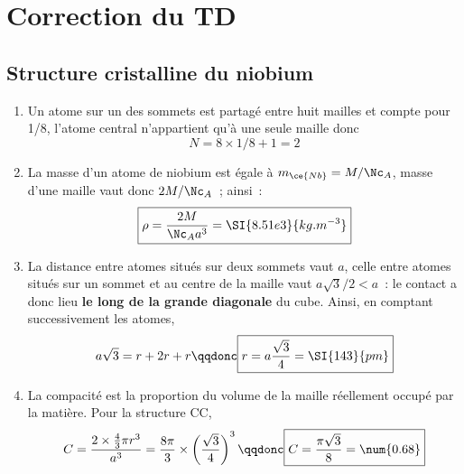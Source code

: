 \documentclass[a4paper, 12pt, final, garamond]{book}
\begin{document}
\setcounter{chapter}{2}

\chapter{Correction du TD}

\section{Structure cristalline du niobium}
\begin{enumerate}
  \item Un atome sur un des sommets est partagé entre huit mailles et compte
    pour 1/8, l'atome central n'appartient qu'à une seule maille donc
    \[
      \boxed{N = 8\times1/8+1=2}
    \]
  \item La masse d'un atome de niobium est égale à $m_{\ce{Nb}} = M/\Nc_A$,
    masse d'une maille vaut donc $2M/\Nc_A$~; ainsi~:
    \[
      \boxed{\rho = \frac{2M}{\Nc_A a^3} = \SI{8.51e3}{kg.m ^{-3}}}
    \]
  \item La distance entre atomes situés sur deux sommets vaut $a$, celle entre
    atomes situés sur un sommet et au centre de la maille vaut $a \sqrt{3}/2 <
    a$~: le contact a donc lieu \textbf{le long de la grande diagonale} du cube.
    Ainsi, en comptant successivement les atomes,
    \[
      a \sqrt{3} = r+2r+r
      \qqdonc
      \boxed{r = a \frac{\sqrt{3}}{4} = \SI{143}{pm}}
    \]
  \item La compacité est la proportion du volume de la maille réellement occupé
    par la matière. Pour la structure CC,
    \[
      C = \frac{2\times \frac{4}{3}\pi r^3}{a^3} = \frac{8\pi}{3}\times \left(
      \frac{\sqrt{3}}{4} \right)^{3}
      \qqdonc
      \boxed{C = \frac{\pi \sqrt{3}}{8} = \num{0.68}}
    \]
\end{enumerate}
\end{document}
